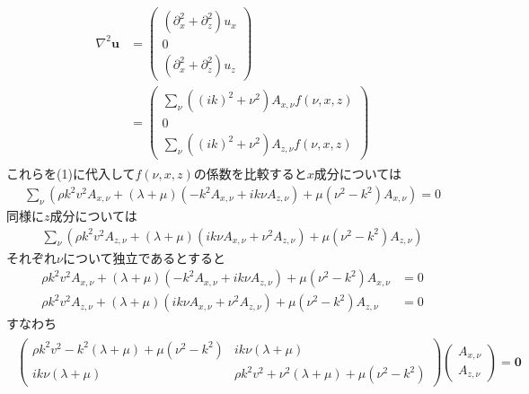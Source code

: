 \documentclass[uplatex,a4j,11pt,dvipdfmx]{jsarticle}
\begin{document}
\begin{align}
  \begin{split}
    \nabla^2{\bm u}&=\left(
      \begin{array}{c}
        (\partial_x^2+\partial_z^2)u_x\\
        0\\
        (\partial_x^2+\partial_z^2)u_z
      \end{array}
    \right)\\
    &=\left(
      \begin{array}{c}
        \sum_\nu ((ik)^2+\nu^2)A_{x,\nu}f(\nu,x,z)\\
        0\\
        \sum_\nu ((ik)^2+\nu^2)A_{z,\nu}f(\nu,x,z)
      \end{array}
    \right)
  \end{split}
\end{align}
これらを(1)に代入して$f(\nu,x,z)$の係数を比較すると$x$成分については
\begin{align}
  \sum_\nu\left(\rho k^2v^2A_{x,\nu}+(\lambda+\mu)(-k^2A_{x,\nu}+ik\nu A_{z,\nu})+\mu(\nu^2-k^2)A_{x,\nu}\right)=0
\end{align}
同様に$z$成分については
\begin{align}
  \sum_\nu\left(\rho k^2v^2A_{z,\nu}+(\lambda+\mu)(ik\nu A_{x,\nu}+\nu^2A_{z,\nu})+\mu(\nu^2-k^2)A_{z,\nu}\right)
\end{align}
それぞれ$\nu$について独立であるとすると
\begin{align}
  \rho k^2v^2A_{x,\nu}+(\lambda+\mu)(-k^2A_{x,\nu}+ik\nu A_{z,\nu})+\mu(\nu^2-k^2)A_{x,\nu}&=0\\
  \rho k^2v^2A_{z,\nu}+(\lambda+\mu)(ik\nu A_{x,\nu}+\nu^2A_{z,\nu})+\mu(\nu^2-k^2)A_{z,\nu}&=0
\end{align}
すなわち
\begin{align}
  \begin{split}
    \left(
      \begin{array}{cc}
      \rho k^2v^2-k^2(\lambda+\mu)+\mu(\nu^2-k^2)&ik\nu(\lambda+\mu)\\
      ik\nu(\lambda+\mu)&\rho k^2v^2+\nu^2(\lambda+\mu)+\mu(\nu^2-k^2)
    \end{array}
    \right)
    \left(
      \begin{array}{c}
        A_{x,\nu}\\A_{z,\nu}
      \end{array}
    \right)
    ={\bm 0}
  \end{split}
\end{align}
\end{document}

